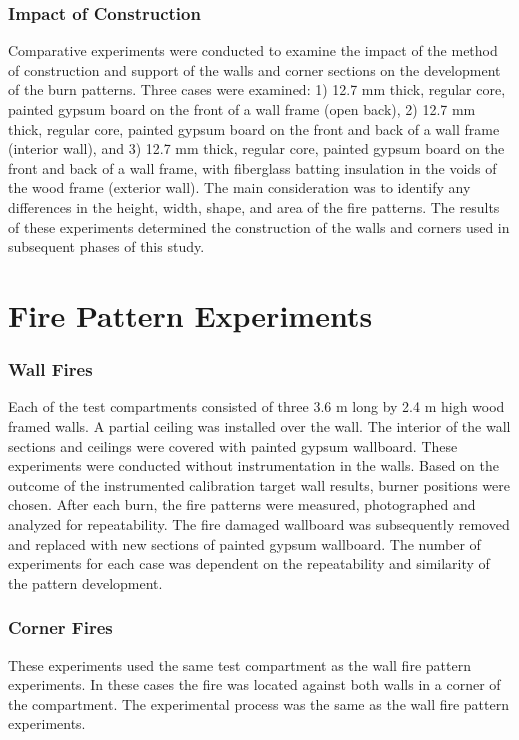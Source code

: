 \documentclass[twoside]{uocthesis}
\begin{document}
\subsubsection{Impact of Construction}

Comparative experiments were conducted to examine the impact of the method of construction and support of the walls and corner sections on the development of the burn patterns.  Three cases were examined: 1) 12.7 mm thick, regular core, painted gypsum board on the front of a wall frame (open back), 2) 12.7 mm thick, regular core, painted gypsum board on the front and back of a wall frame (interior wall), and 3) 12.7 mm thick, regular core, painted gypsum board on the front and back of a wall frame, with fiberglass batting insulation in the voids of the wood frame (exterior wall).  The main consideration was to identify any differences in the height, width, shape, and area of the fire patterns. The results of these experiments determined the construction of the walls and corners used in subsequent phases of this study.


\section{Fire Pattern Experiments}

\subsubsection{Wall Fires}

Each of the test compartments consisted of three 3.6 m long by 2.4 m high wood framed walls. A partial ceiling was installed over the wall. The interior of the wall sections and ceilings were covered with painted gypsum wallboard.  These experiments were conducted without instrumentation in the walls.  Based on the outcome of the instrumented calibration target wall results, burner positions were chosen. After each burn, the fire patterns were measured, photographed and analyzed for repeatability. The fire damaged wallboard was subsequently removed and replaced with new sections of painted gypsum wallboard. The number of experiments for each case was dependent on the repeatability and similarity of the pattern development.

\subsubsection{Corner Fires}
 
These experiments used the same test compartment as the wall fire pattern experiments.  In these cases the fire was located against both walls in a corner of the compartment.  The experimental process was the same as the wall fire pattern experiments.
\end{document}
